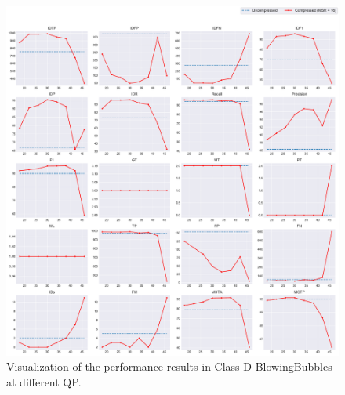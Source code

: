 \begin{figure}[!htbp]
  \centering
  \includegraphics[width=1.0\linewidth]{img/BlowingBubbles_0_multiplots_qp.pdf}
  \caption[Visualization of the performance results in Class D BlowingBubbles at different QP]
  {
    Visualization of the performance results in Class D BlowingBubbles at different QP.
  }
  \label{fig:BlowingBubbles_0_multiplots_qp}
\end{figure}